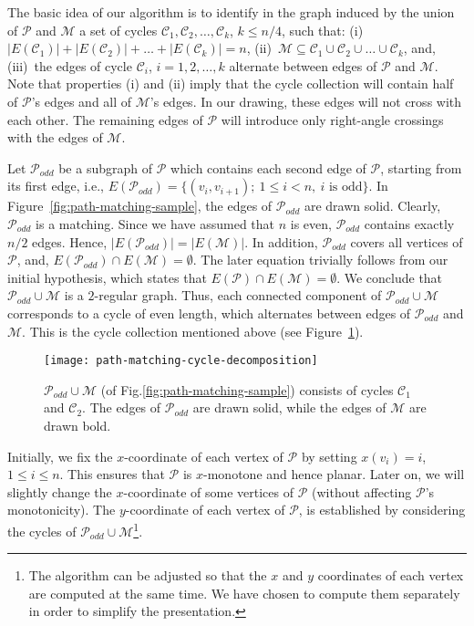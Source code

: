 \documentclass{llncs}
\begin{document}
The basic idea of our algorithm is to identify in the graph induced
by the union of $\mathcal{P}$ and $\mathcal{M}$ a set of cycles
$\mathcal{C}_1, \mathcal{C}_2, \ldots, \mathcal{C}_k$, $k \leq n/4$,
such that: (i)~$|E(\mathcal{C}_1)| + |E(\mathcal{C}_2)| + \ldots +
|E(\mathcal{C}_k)|=n$, (ii)~$\mathcal{M} \subseteq \mathcal{C}_1
\cup \mathcal{C}_2 \cup \ldots \cup \mathcal{C}_k$, and, (iii)~the
edges of cycle $\mathcal{C}_i$,  $i=1,2,\ldots,k$ alternate between
edges of $\mathcal{P}$ and $\mathcal{M}$. Note that properties (i)
and (ii) imply that the cycle collection will contain half of
$\mathcal{P}$'s edges and all of $\mathcal{M}$'s edges. In our
drawing, these edges will not cross with each other. The remaining
edges of $\mathcal{P}$ will introduce only right-angle crossings
with the edges of $\mathcal{M}$.

Let $\mathcal{P}_{odd}$ be a subgraph of $\mathcal{P}$ which
contains each second edge of $\mathcal{P}$, starting from its first
edge, i.e., $E(\mathcal{P}_{odd}) = \{(v_i,v_{i+1});~1\leq i <
n,~i\text{ is odd}\}$. In Figure~\ref{fig:path-matching-sample}, the
edges of $\mathcal{P}_{odd}$ are drawn solid. Clearly,
$\mathcal{P}_{odd}$ is a matching. Since we have assumed that $n$ is
even, $\mathcal{P}_{odd}$ contains exactly $n/2$ edges. Hence,
$|E(\mathcal{P}_{odd})|=|E(\mathcal{M})|$. In addition,
$\mathcal{P}_{odd}$ covers all vertices of $\mathcal{P}$, and,
$E(\mathcal{P}_{odd}) \cap E(\mathcal{M}) = \emptyset$. The later
equation trivially follows from our initial hypothesis, which states
that $E(\mathcal{P}) \cap E(\mathcal{M}) = \emptyset$. We conclude
that $\mathcal{P}_{odd} \cup \mathcal{M}$ is a $2$-regular graph.
Thus, each connected component of $\mathcal{P}_{odd} \cup
\mathcal{M}$ corresponds to a cycle of even length, which alternates
between edges of $\mathcal{P}_{odd}$ and $\mathcal{M}$. This is the
cycle collection mentioned above (see
Figure~\ref{fig:path-matching-cycle-decomposition}).

\begin{figure}[t!hb]
  \centering
  \texttt{[image: path-matching-cycle-decomposition]}
  \caption{$\mathcal{P}_{odd} \cup \mathcal{M}$ (of Fig.\ref{fig:path-matching-sample})
  consists of cycles $\mathcal{C}_1$ and $\mathcal{C}_2$. The edges of $\mathcal{P}_{odd}$
  are drawn solid, while the edges of $\mathcal{M}$ are drawn bold.}
  \label{fig:path-matching-cycle-decomposition}
\end{figure}

Initially, we fix the $x$-coordinate of each vertex of $\mathcal{P}$
by setting $x(v_i) = i$, $1 \leq i \leq n$. This ensures that
$\mathcal{P}$ is $x$-monotone and hence planar. Later on, we will
slightly change the $x$-coordinate of some vertices of $\mathcal{P}$
(without affecting $\mathcal{P}$'s monotonicity). The $y$-coordinate
of each vertex of $\mathcal{P}$, is established by considering the
cycles of $\mathcal{P}_{odd} \cup \mathcal{M}$\footnote{The
algorithm can be adjusted so that the $x$ and $y$ coordinates of
each vertex are computed at the same time. We have chosen to compute
them separately in order to simplify the presentation.}.
\end{document}
